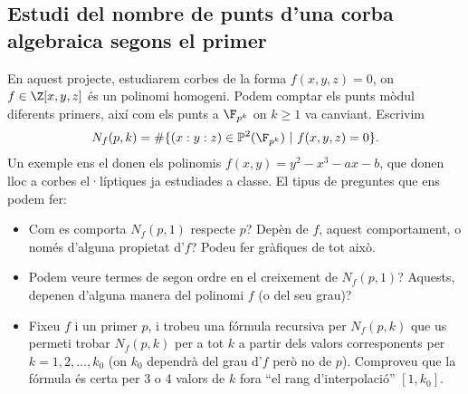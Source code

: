  \subsection{Estudi del nombre de punts d'una corba algebraica segons el primer}
 
 En aquest projecte, estudiarem corbes de la forma $f(x,y,z)=0$, on $f\in\Z[x,y,z]$ és un polinomi homogeni. Podem comptar els punts mòdul diferents primers, així com els punts a $\F_{p^k}$ on $k\geq 1$ va canviant. Escrivim
 \[
 N_f(p,k) = \# \{ (x:y:z)\in\mathbb{P}^2(\F_{p^k}) ~|~ f(x,y,z) = 0\}.
 \]
 Un exemple ens el donen els polinomis $f(x,y)=y^2-x^3-ax-b$, que donen lloc a corbes el·líptiques ja estudiades a classe. El tipus de preguntes que ens podem fer:
 \begin{itemize}
     \item Com es comporta $N_f(p,1)$ respecte $p$? Depèn de $f$, aquest comportament, o només d'alguna propietat d'$f$? Podeu fer gràfiques de tot això.
     \item Podem veure termes de segon ordre en el creixement de $N_f(p,1)$? Aquests, depenen d'alguna manera del polinomi $f$ (o del seu grau)?
     \item Fixeu $f$ i un primer $p$, i trobeu una fórmula recursiva per $N_f(p,k)$ que us permeti trobar $N_f(p,k)$ per a tot $k$ a partir dels valors corresponents per $k=1,2,\ldots, k_0$ (on $k_0$ dependrà del grau d'$f$ però no de $p$). Comproveu que la fórmula és certa per 3 o 4 valors de $k$ fora ``el rang d'interpolació'' $[1,k_0]$.
 \end{itemize}
 